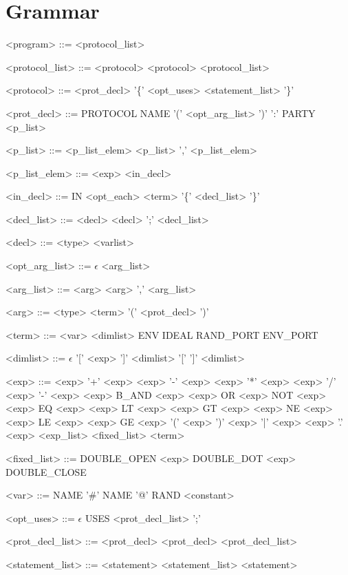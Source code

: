 
\section{Grammar}
\begin{grammar}
<program> ::= <protocol\_list>

<protocol\_list> ::= <protocol> \alt <protocol> <protocol\_list>

<protocol> ::= <prot\_decl> '\{' <opt\_uses> <statement\_list> '\}'

<prot\_decl> ::= PROTOCOL NAME '(' <opt\_arg\_list> ')' ':' PARTY <p\_list>

<p\_list> ::= <p\_list\_elem> \alt <p\_list> ',' <p\_list\_elem>

<p\_list\_elem> ::= <exp> \alt <in\_decl>

<in\_decl> ::= IN <opt\_each> <term> '\{' <decl\_list> '\}'

<decl\_list> ::= <decl> \alt <decl> ';' <decl\_list>

<decl> ::= <type> <varlist>

<opt\_arg\_list> ::= $\epsilon$ \alt <arg\_list>

<arg\_list> ::= <arg> \alt <arg> ',' <arg\_list>

<arg> ::= <type> <term> \alt '(' <prot\_decl> ')'

<term> ::= <var> <dimlist> \alt ENV \alt IDEAL \alt RAND\_PORT \alt ENV\_PORT

<dimlist> ::= $\epsilon$ \alt '[' <exp> ']' <dimlist> \alt '[' ']' <dimlist>

<exp> ::= <exp> '+' <exp> \alt <exp> '-' <exp> \alt <exp> '*' <exp> \alt <exp> '/' <exp> \alt '-' <exp> \alt <exp> B\_AND <exp> \alt <exp> OR <exp> \alt NOT <exp> \alt <exp> EQ <exp> \alt <exp> LT <exp> \alt <exp> GT <exp> \alt <exp> NE <exp> \alt <exp> LE <exp> \alt <exp> GE <exp> \alt '(' <exp> ')' \alt <exp> '|' <exp> \alt <exp> '.' <exp> \alt <exp\_list> \alt <fixed\_list> \alt <term>

<fixed\_list> ::= DOUBLE\_OPEN <exp> DOUBLE\_DOT <exp> DOUBLE\_CLOSE

<var> ::= NAME \alt '\#' NAME \alt '@' \alt RAND \alt <constant>

<opt\_uses> ::= $\epsilon$ \alt USES <prot\_decl\_list> ';'

<prot\_decl\_list> ::= <prot\_decl> \alt <prot\_decl> <prot\_decl\_list>

<statement\_list> ::= <statement> \alt <statement\_list> <statement>


\end{grammar}
